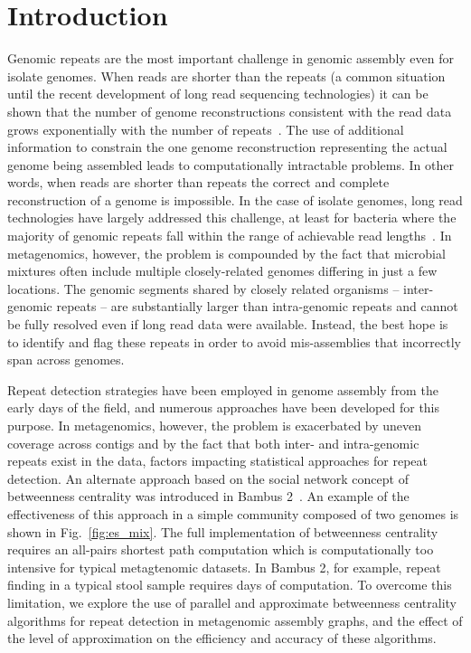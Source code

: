 \documentclass[runningheads,a4paper]{llncs}
\begin{document}
\section{Introduction}

Genomic repeats are the most important challenge in genomic assembly even for isolate genomes.  When reads are shorter than the repeats (a common situation until the recent development of long read sequencing technologies) it can be shown that the number of genome reconstructions consistent with the read data grows exponentially with the number of repeats~\cite{kingsford}.  The use of additional information to constrain the one genome reconstruction representing the actual genome being assembled leads to computationally intractable problems. In other words, when reads are shorter than repeats the correct and complete reconstruction of a genome is impossible.  In the case of isolate genomes, long read technologies have largely addressed this challenge, at least for bacteria where the majority of genomic repeats fall within the range of achievable read lengths~\cite{koren2015one}.  In metagenomics, however, the problem is compounded by the fact that microbial mixtures often include multiple closely-related genomes differing in just a few locations.  The genomic segments shared by closely related organisms -- inter-genomic repeats -- are substantially larger than intra-genomic repeats and cannot be fully resolved even if long read data were available. Instead, the best hope is to identify and flag these repeats  in order to avoid mis-assemblies that incorrectly span across genomes. 

Repeat detection strategies have been employed in genome assembly from the early days of the field, and numerous approaches have been developed for this purpose.  In metagenomics, however, the problem is exacerbated by uneven coverage across contigs and by the fact that both inter- and intra-genomic repeats exist in the data, factors impacting statistical approaches for repeat detection.  An alternate approach based on the social network concept of betweenness centrality was introduced in Bambus 2~\cite{bambus}. An example of the effectiveness of this approach in a simple community composed of two genomes is shown in Fig.~\ref{fig:es_mix}.   The full implementation of betweenness centrality requires an all-pairs shortest path computation which is computationally too intensive for typical metagtenomic datasets.  In Bambus 2, for example, repeat finding in a typical stool sample requires days of computation.
To overcome this limitation, we explore the use of parallel and approximate betweenness centrality algorithms for repeat detection in metagenomic assembly graphs, and the effect of the level of approximation on the efficiency and accuracy of these algorithms.  
\end{document}
